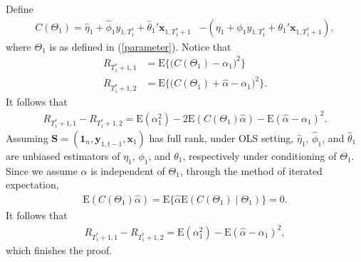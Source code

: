 \documentclass[11pt,3p,review,authoryear]{elsarticle}
\def\mbf#1{\mathbf{#1}} %
\def\mrm#1{\mathrm{#1}} %
\def\E#1{\mathrm{E}(#1)} %
\theoremstyle{definition}
\newenvironment{proof-of-lemma}[1][{}]{\noindent{\bf
    Proof of Lemma {#1}}
  \hspace*{.5em}}{\qed\bigskip\\}
\begin{document}
  
\begin{proof-of-lemma}[\ref{risklemma}]
  Define 
  \begin{align*}
    C(\Theta_1) =\hat{\eta}_1 +\hat{\phi}_1 y_{1, T_1^*}+\hat{\theta}_1'\mbf{x}_{1, T_1^*+1} 
    &- (\eta_1 +\phi_1y_{1,T_1^*}+\theta_1'\mbf{x}_{1,T_1^*+1}),
  \end{align*}
  where $\Theta_1$ is as defined in (\ref{parameter}). Notice that
  \begin{align*}
    R_{T_1^*+1,1}
    &= \mrm{E}\big\{\big(C(\Theta_1)-\alpha_1\big)^2\big\}\\
     R_{T_1^*+1,2} &=  \mrm{E}\big\{\big(C(\Theta_1)+\hat{\alpha}-\alpha_1\big)^2\big\}.
  \end{align*}
  It follows that
  \begin{align*}
    R_{T_1^*+1,1}-R_{T_1^*+1,2}=\E{\alpha_1^2}-2\E{C(\Theta_1)\hat{\alpha}}-\E{\hat{\alpha}-\alpha_1}^2.
  \end{align*}
  Assuming $\mbf{S}=(\mbf{1}_n, \mbf{y}_{1,t-1}, \mbf{x}_{1})$ has full rank, under OLS setting, $\hat{\eta}_1$, $\hat{\phi}_1$, and $\hat{\theta}_1$ are unbiased estimators of $\eta_1$, $\phi_1$, and $\theta_1$, respectively under conditioning of $\Theta_1$. Since we assume $\hat{\alpha}$ is independent of $\Theta_1$, through the method of iterated expectation,
  \begin{align*}
    \E{C(\Theta_1)\hat{\alpha}}=\mrm{E}\big\{\hat{\alpha}\E{C(\Theta_1)\mid \Theta_1}\}=0.
  \end{align*}
  It follows that
  \begin{align*}
    R_{T_1^*+1,1}-R_{T_1^*+1,2}=\E{\alpha_1^2}-\E{\hat{\alpha}-\alpha_1}^2,
  \end{align*}
  which finishes the proof.
\end{proof-of-lemma}
\end{document}
